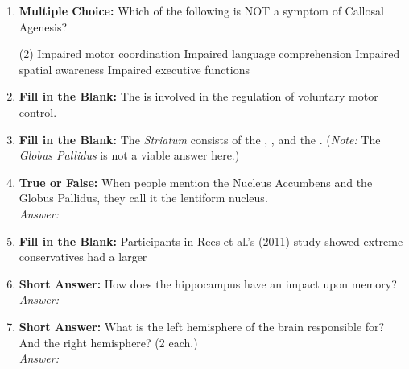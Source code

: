 \begin{enumerate}[label=\textbf{Q1.10.\arabic*}]
      \item \textbf{Multiple Choice:} Which of the following is NOT a symptom of Callosal Agenesis?
            \begin{tasks}[label=(\Alph*), label-width=1.5em, item-indent=1.7em](2) %
                  \task Impaired motor coordination
                  \task Impaired language comprehension
                  \task Impaired spatial awareness
                  \task Impaired executive functions
            \end{tasks}

      \item \textbf{Fill in the Blank:} The \underline{\hspace{3cm}} is involved in the regulation of voluntary motor control. \\

      \item \textbf{Fill in the Blank:} The \textit{Striatum} consists of the \underline{\hspace{3cm}}, \underline{\hspace{3cm}}, and the \underline{\hspace{3cm}}. (\textit{Note:} The \textit{Globus Pallidus} is not a viable answer here.) \\

      \item \textbf{True or False:} When people mention the Nucleus Accumbens and the Globus Pallidus, they call it the lentiform nucleus. \\
            \textit{Answer:} %

      \item \textbf{Fill in the Blank:} Participants in Rees et al.'s (2011) study showed extreme conservatives had a larger \underline{\hspace{3cm}} \\

      \item \textbf{Short Answer:} How does the hippocampus have an impact upon memory? \\
            \textit{Answer:} %

      \item \textbf{Short Answer:} What is the left hemisphere of the brain responsible for? And the right hemisphere? (2 each.) \\
            \textit{Answer:} \\%


\end{enumerate}
